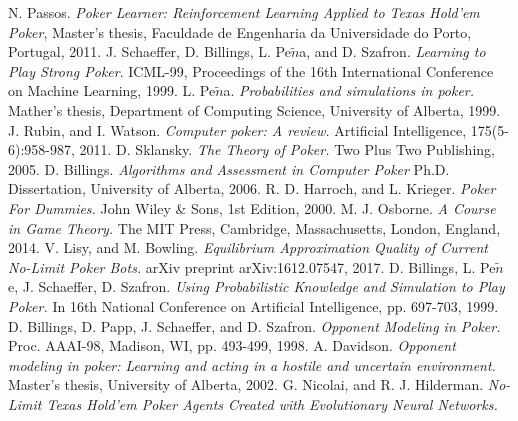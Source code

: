 
\begin{thebibliography}{9}
  N. Passos.
  \textit{Poker Learner: Reinforcement Learning Applied to Texas Hold'em Poker},
  Master's thesis, Faculdade de Engenharia da Universidade do Porto, Portugal, 
  2011.
  \href{https://paginas.fe.up.pt/$\sim$ei08029/Master\%20Thesis\%20-\%20Nuno\%20Passos.pdf}{}
   J. Schaeffer, D. Billings, L. Pe$\tilde{n}$a, and D. Szafron.
  \textit{Learning to Play Strong Poker}.
  ICML-99, Proceedings of the 16th International Conference on Machine Learning, 
  1999.
  \href{http://poker.cs.ualberta.ca/publications/ICML99.pdf}{}
  L. Pe$\tilde{n}$a.
  \textit{Probabilities and simulations in poker.}
  Mather's thesis, Department of Computing Science, University of Alberta,
  1999.
  J. Rubin, and I. Watson.
  \textit{Computer poker: A review.}
   Artificial Intelligence, 175(5-6):958-987,
  2011.
  D. Sklansky.
  \textit{The Theory of Poker.}
   Two Plus Two Publishing,
  2005.
  D. Billings.
  \textit{Algorithms and Assessment in Computer Poker}
   Ph.D. Dissertation, University of Alberta,
  2006.
  R. D. Harroch, and L. Krieger.
  \textit{Poker For Dummies.}
   John Wiley \& Sons, 1st Edition,
  2000.
  M. J. Osborne.
  \textit{A Course in Game Theory.}
   The MIT Press, Cambridge, Massachusetts, London, England,
  2014.
  V. Lisy, and M. Bowling.
  \textit{Equilibrium Approximation Quality of Current No-Limit Poker Bots.}
   arXiv preprint arXiv:1612.07547,
  2017.
  D. Billings, L. Pe$\tilde{n}$e, J. Schaeffer, D. Szafron.
  \textit{Using Probabilistic Knowledge and Simulation to Play Poker.}
   In 16th National Conference on Artificial
Intelligence, pp. 697-703,
  1999.
  D. Billings, D. Papp, J. Schaeffer, and D. Szafron.
  \textit{Opponent Modeling in Poker.}
   Proc. AAAI-98, Madison, WI, pp. 493-499,
  1998.
  A. Davidson.
  \textit{Opponent modeling in poker: Learning and acting in a hostile and uncertain environment.}
   Master’s thesis, University of Alberta, 
  2002.
G. Nicolai, and R. J. Hilderman.
\textit{No-Limit Texas Hold'em Poker Agents Created with Evolutionary Neural Networks.}

\end{thebibliography}
